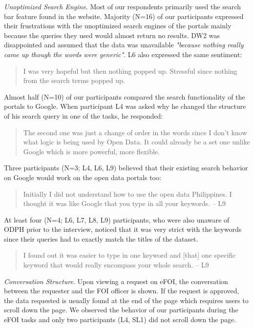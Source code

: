 \documentclass{sigchi}
\begin{document}
\textit{Unoptimized Search Engine}. Most of our respondents primarily used the search bar feature found in the website. Majority (N=16) of our participants expressed their frustrations with the unoptimized search engines of the portals mainly because the queries they used would almost return no results. DW2 was disappointed and assumed that the data was unavailable \textit{"because nothing really came up though the words were generic"}. L6 also expressed the same sentiment:
\begin{quote}
I was very hopeful but then nothing popped up. Stressful since nothing from the search terms popped up.
\end{quote}

Almost half (N=10) of our participants compared the search functionality of the portals to Google. When participant L4 was asked why he changed the structure of his search query in one of the tasks, he responded:
\begin{quote}
The second one was just a change of order in the words since I don't know what logic is being used by Open Data. It could already be a set one unlike Google which is more powerful, more flexible.
\end{quote}

Three participants (N=3; L4, L6, L9) believed that their existing search behavior on Google would work on the open data portals too:
\begin{quote}
Initially I did not understand how to use the open data Philippines. I thought it was like Google that you type in all your keywords. -- L9
\end{quote}

At least four (N=4; L6, L7, L8, L9) participants, who were also unaware of ODPH prior to the interview, noticed that it was very strict with the keywords since their queries had to exactly match the titles of the dataset. 
\begin{quote}
I found out it was easier to type in one keyword and [that] one specific keyword that would really encompass your whole search. -- L9
\end{quote}

\textit{Conversation Structure}. Upon viewing a request on eFOI, the conversation between the requester and the FOI officer is shown. If the request is approved, the data requested is usually found at the end of the page which requires users to scroll down the page. We observed the behavior of our participants during the eFOI tasks and only two participants (L4, SL1) did not scroll down the page.
\end{document}
